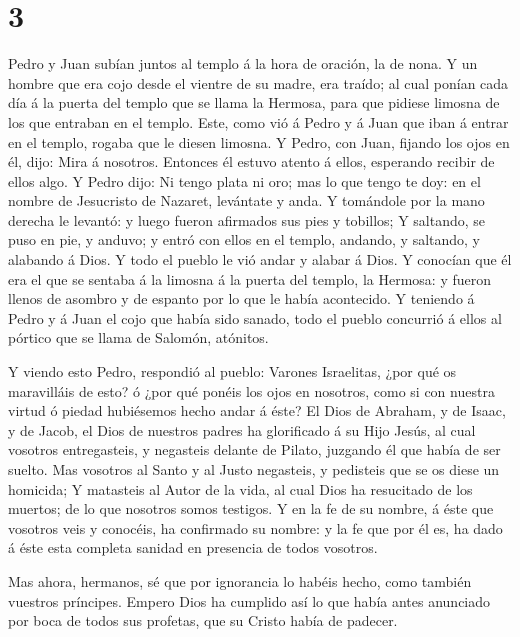 \hypertarget{section-2}{%
\section{3}\label{section-2}}

 Pedro y Juan subían juntos al templo á la hora de oración,
la de nona.  Y un hombre que era cojo desde el vientre de su
madre, era traído; al cual ponían cada día á la puerta del templo que se
llama la Hermosa, para que pidiese limosna de los que entraban en el
templo.  Este, como vió á Pedro y á Juan que iban á entrar
en el templo, rogaba que le diesen limosna.  Y Pedro, con
Juan, fijando los ojos en él, dijo: Mira á nosotros. 
Entonces él estuvo atento á ellos, esperando recibir de ellos algo.
 Y Pedro dijo: Ni tengo plata ni oro; mas lo que tengo te
doy: en el nombre de Jesucristo de Nazaret, levántate y anda.
 Y tomándole por la mano derecha le levantó: y luego fueron
afirmados sus pies y tobillos;  Y saltando, se puso en pie,
y anduvo; y entró con ellos en el templo, andando, y saltando, y
alabando á Dios.  Y todo el pueblo le vió andar y alabar á
Dios.  Y conocían que él era el que se sentaba á la limosna
á la puerta del templo, la Hermosa: y fueron llenos de asombro y de
espanto por lo que le había acontecido.  Y teniendo á Pedro
y á Juan el cojo que había sido sanado, todo el pueblo concurrió á ellos
al pórtico que se llama de Salomón, atónitos.

 Y viendo esto Pedro, respondió al pueblo: Varones
Israelitas, ¿por qué os maravilláis de esto? ó ¿por qué ponéis los ojos
en nosotros, como si con nuestra virtud ó piedad hubiésemos hecho andar
á éste?  El Dios de Abraham, y de Isaac, y de Jacob, el
Dios de nuestros padres ha glorificado á su Hijo Jesús, al cual vosotros
entregasteis, y negasteis delante de Pilato, juzgando él que había de
ser suelto.  Mas vosotros al Santo y al Justo negasteis, y
pedisteis que se os diese un homicida;  Y matasteis al
Autor de la vida, al cual Dios ha resucitado de los muertos; de lo que
nosotros somos testigos.  Y en la fe de su nombre, á éste
que vosotros veis y conocéis, ha confirmado su nombre: y la fe que por
él es, ha dado á éste esta completa sanidad en presencia de todos
vosotros.

 Mas ahora, hermanos, sé que por ignorancia lo habéis
hecho, como también vuestros príncipes.  Empero Dios ha
cumplido así lo que había antes anunciado por boca de todos sus
profetas, que su Cristo había de padecer.

